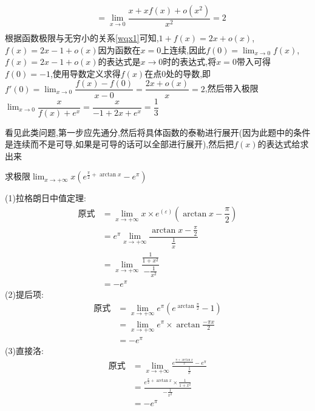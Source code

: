 \documentclass[9pt a4paper, oneside, UTF8]{ctexbook}
\begin{document}
\begin{sloppypar}
\begin{solution}
\begin{equation*}
\begin{split}
                & = \lim_{x \to 0}\dfrac{x+xf(x)+o(x^2)}{x^2}=2 \\
            \end{split}
        \end{equation*} 
    根据函数极限与无穷小的关系\ref{wqx1}可知,$1+f(x)=2x+o(x)$,$f(x)=2x-1+o(x)$因为函数在$x=0$上连续,因此$f(0)=\lim_{x\to 0}f(x)$,$f(x)=2x-1+o(x)$的表达式是$x\to 0$时的表达式,将$x=0$带入可得$f(0)=-1$,使用导数定义求得$f(x)$在点0处的导数,即$f'(0)=\lim_{x \to 0}\dfrac{f(x)-f(0)}{x-0}=\dfrac{2x+o(x)}{x}=2$,然后带入极限$\lim_{x\to 0}\dfrac{x}{f(x)+e^x}=\dfrac{x}{-1+2x+e^x}=\dfrac{1}{3}$
    \end{solution}
    \begin{note}
        看见此类问题,第一步应先通分,然后将具体函数的泰勒进行展开(因为此题中的条件是连续而不是可导,如果是可导的话可以全部进行展开),然后把$f(x)$的表达式给求出来
    \end{note}
    \begin{problem}
        求极限$\lim_{x\to +\infty}x(e^{\frac{\pi}{2}+\arctan x}-e^\pi)$
    \end{problem}
    \begin{solution}
        (1)拉格朗日中值定理:
        \begin{align*}
            \text{原式} & = \lim_{x\to +\infty}x\times e^{(\varepsilon)}(\arctan x -\dfrac{\pi}{2})\\
            & = e^{\pi} \lim_{x\to +\infty}\dfrac{\arctan x -\frac{\pi}{2}}{\frac1x}\\
            & =\lim_{x\to +\infty} \dfrac{\frac{1}{1+x^2}}{-\frac{1}{x^2}}\\
            & =-e^\pi 
        \end{align*}
        (2)提后项:
        \begin{align*}
            \text{原式} & = \lim_{x\to +\infty}e^\pi(e^{\arctan \frac{\pi}{2}}-1)\\
            & =\lim_{x\to +\infty}e^\pi\times\arctan \frac{-\pi x}{2}\\
            & =-e^\pi
        \end{align*}
        (3)直接洛:
        \begin{align*}
          \text{原式} & = \lim_{x\to +\infty}\frac{e^{\frac{\pi+\arctan x}{2}}-e^\pi}{\frac{1}{x}} \\
          & = \frac{e^{\frac{\pi}{2}+\arctan x}\times\frac{1}{1+x^{2}}}{-\frac{1}{x^{2}}} \\
          & = -e^\pi
        \end{align*}

\end{solution}
\end{sloppypar}
\end{document}

